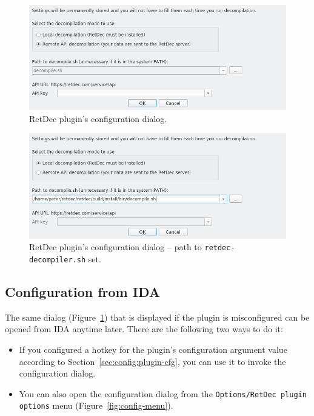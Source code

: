 \documentclass[pdftex, a4paper,12pt, oneside, svgnames]{article}
\begin{document}
\begin{figure}[!ht]
	\centering
	\includegraphics[width=13cm]{figures/config-1}
	\caption{RetDec plugin's configuration dialog.}
	\label{fig:config-dialog-1}
\end{figure}

\begin{figure}[!ht]
	\centering
	\includegraphics[width=13cm]{figures/config-2}
	\caption{RetDec plugin's configuration dialog -- path to \texttt{retdec-decompiler.sh} set.}
	\label{fig:config-dialog-2}
\end{figure}

\subsection{Configuration from IDA}
\label{sec:config:from-ida}
The same dialog (Figure~\ref{fig:config-dialog-1}) that is displayed if the plugin is misconfigured can be opened from IDA anytime later. There are the following two ways to do it:
\begin{itemize}
	\item If you configured a hotkey for the plugin's configuration argument value according to Section~\ref{sec:config:plugin-cfg}, you can use it to invoke the configuration dialog.
	\item You can also open the configuration dialog from the \texttt{Options/RetDec plugin options} menu (Figure~\ref{fig:config-menu}).
\end{itemize}
\end{document}
